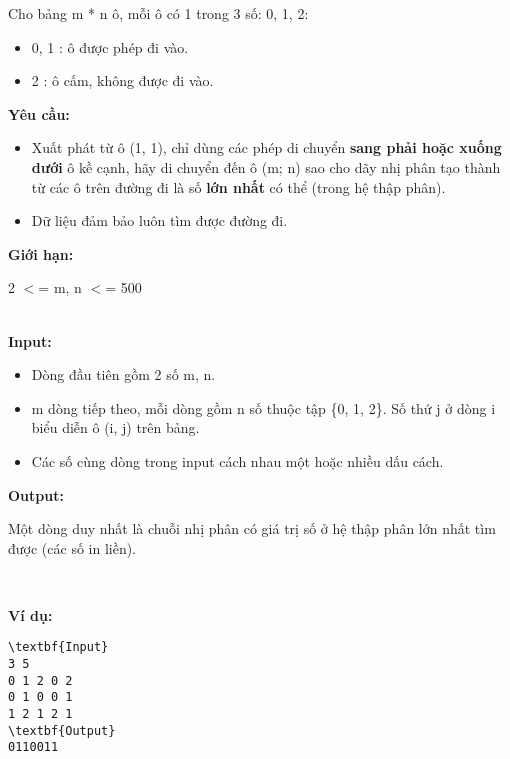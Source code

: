 

Cho bảng m * n ô, mỗi ô có 1 trong 3 số: 0, 1, 2:
\begin{itemize}
	\item 0, 1 : ô được phép đi vào.
	\item 2 : ô cấm, không được đi vào.
\end{itemize}

\textbf{Yêu cầu: }\textbf{}
\begin{itemize}
	\item Xuất phát từ ô (1, 1), chỉ dùng các phép di chuyển \textbf{ sang phải hoặc xuống dưới } ô kề cạnh, hãy di chuyển đến ô (m; n) sao cho dãy nhị phân tạo thành từ các ô trên đường đi là số \textbf{ lớn nhất } có thể (trong hệ thập phân).
	\item Dữ liệu đảm bảo luôn tìm được đường đi.
\end{itemize}

\textbf{Giới hạn: }

2 $<$= m, n $<$= 500


\\\textbf{Input: }\textbf{}
\begin{itemize}
	\item Dòng đầu tiên gồm 2 số m, n.
	\item m dòng tiếp theo, mỗi dòng gồm n số thuộc tập \{0, 1, 2\}. Số thứ j ở dòng i biểu diễn ô (i, j) trên bảng.
	\item Các số cùng dòng trong input cách nhau một hoặc nhiều dấu cách.
\end{itemize}

\textbf{Output: }

Một dòng duy nhất là chuỗi nhị phân có giá trị số ở hệ thập phân lớn nhất tìm được (các số in liền).

 

\textbf{Ví dụ: }\textbf{}
\begin{verbatim}
\textbf{Input}
3 5
0 1 2 0 2
0 1 0 0 1
1 2 1 2 1
\textbf{Output}
0110011\end{verbatim}